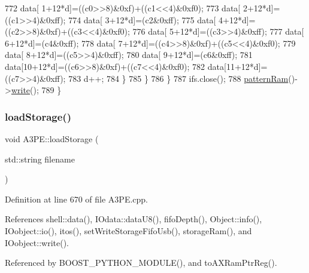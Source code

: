 \begin{DoxyCode}
772           data[ 1+12*d]=((c0>>8)&0xf)+((c1<<4)&0xf0);
773           data[ 2+12*d]=((c1>>4)&0xff);
774           data[ 3+12*d]=(c2&0xff);
775           data[ 4+12*d]=((c2>>8)&0xf)+((c3<<4)&0xf0);
776           data[ 5+12*d]=((c3>>4)&0xff);
777           data[ 6+12*d]=(c4&0xff);
778           data[ 7+12*d]=((c4>>8)&0xf)+((c5<<4)&0xf0);
779           data[ 8+12*d]=((c5>>4)&0xff);
780           data[ 9+12*d]=(c6&0xff);
781           data[10+12*d]=((c6>>8)&0xf)+((c7<<4)&0xf0);
782           data[11+12*d]=((c7>>4)&0xff);
783           d++;
784         \}
785       \}
786   \}
787   ifs.close();
788   \hyperlink{classA3PE_a94ef54086baa29f7f6638c13d8906e56}{patternRam}()->\hyperlink{classIOobject_a9f6984bc9f0fadcf800f1be2523ac744}{write}();
789 \}
\end{DoxyCode}
\mbox{\label{classA3PE_a8bd4a7a5dd8219f93386756c24a0f0b5}} 
\subsubsection{\texorpdfstring{load\+Storage()}{loadStorage()}}
{\footnotesize\ttfamily void A3\+P\+E\+::load\+Storage (\begin{DoxyParamCaption}\item[{std\+::string}]{filename }\end{DoxyParamCaption})}



Definition at line 670 of file A3\+P\+E.\+cpp.



References shell\+::data(), I\+Odata\+::data\+U8(), fifo\+Depth(), Object\+::info(), I\+Oobject\+::io(), itos(), set\+Write\+Storage\+Fifo\+Usb(), storage\+Ram(), and I\+Oobject\+::write().



Referenced by B\+O\+O\+S\+T\+\_\+\+P\+Y\+T\+H\+O\+N\+\_\+\+M\+O\+D\+U\+L\+E(), and to\+A\+X\+Ram\+Ptr\+Reg().


